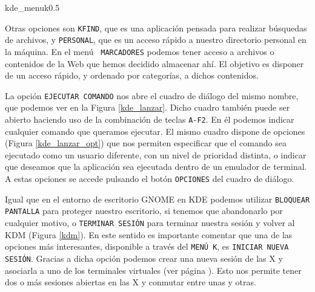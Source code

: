 \begin{figura}{kde_menuk}{0.5}
\caption{Menú K de {\sf KDE}}
\label{kde_menuk}
\end{figura}

Otras opciones  son {\tt  KFIND}, que es  una aplicación  pensada para
realizar búsquedas  de archivos,  y {\tt PERSONAL},  que es  un acceso
rápido a  nuestro directorio personal en  la máquina. En el  menú {\tt
MARCADORES} podemos tener acceso a archivos o contenidos de la Web que
hemos decidido  almacenar ahí.  El objetivo es  disponer de  un acceso
rápido, y ordenado por categorías, a dichos contenidos.

La opción  {\tt EJECUTAR COMANDO}  nos abre  el cuadro de  diálogo del
mismo nombre,  que podemos  ver en  la Figura  \ref{kde_lanzar}. Dicho
cuadro también  puede ser  abierto haciendo uso  de la  combinación de
teclas  {\tt  A-F2}.  En  él podemos  indicar  cualquier  comando  que
queramos  ejecutar.  El  mismo  cuadro  dispone  de  opciones  (Figura
\ref{kde_lanzar_opt}) que nos permiten  especificar que el comando sea
ejecutado  como  un  usuario  diferente, con  un  nivel  de  prioridad
distinta,  o indicar  que  deseamos que  la  aplicación sea  ejecutada
dentro de un emulador de terminal. A estas opciones se accede pulsando
el botón {\tt OPCIONES} del cuadro de diálogo.

\begin{figure}[hbtp]
\centering
{}
\end{figure}

Igual que en el entorno de escritorio {\sf GNOME} en {\sf KDE} podemos
utilizar {\tt BLOQUEAR PANTALLA}  para proteger nuestro escritorio, si
tenemos que abandonarlo por cualquier  motivo, o {\tt TERMINAR SESIÓN}
para terminar nuestra sesión y volver al {\sf KDM} (Figura \ref{kdm}).
En este  sentido es importante  comentar que  una de las  opciones más
interesantes, disponible  a través del  {\tt MENÚ K}, es  {\tt INICIAR
NUEVA SESIÓN}. Gracias  a dicha opción podemos crear  una nueva sesión
de las  {\sf X}  y asociarla  a uno de  los terminales  virtuales (ver
página \pageref{terminal}). Esto nos permite  tener dos o más sesiones
abiertas en las {\sf X} y conmutar entre unas y otras.

